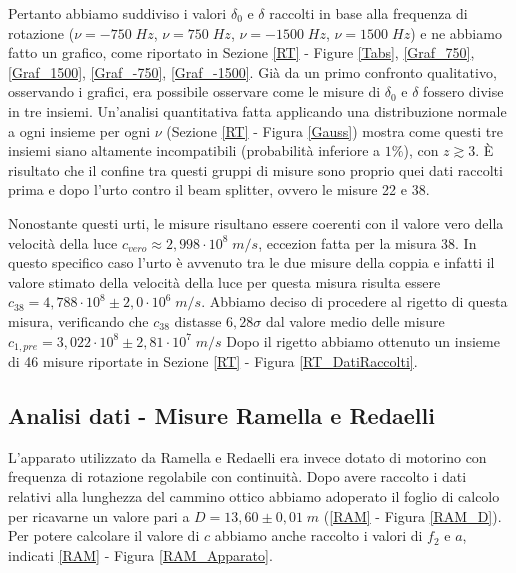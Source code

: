 \documentclass{article}
\begin{document}
\vspace{3mm}

Pertanto abbiamo suddiviso i valori $\delta_0$ e $\delta$ raccolti in base alla frequenza di rotazione ($\nu=-750 \; Hz$, $\nu=750 \; Hz$, 
$\nu=-1500 \; Hz$, $\nu=1500 \; Hz$) e ne abbiamo fatto un grafico, come riportato in Sezione \ref{RT} - Figure \ref{Tabs}, \ref{Graf_750}, \ref{Graf_1500}, \ref{Graf_-750}, 
\ref{Graf_-1500}. 
Già da un primo confronto qualitativo, osservando i grafici, era possibile osservare come le misure di $\delta_0$ e $\delta$ fossero divise in tre insiemi. Un'analisi 
quantitativa fatta applicando una distribuzione normale a ogni insieme per ogni $\nu$ (Sezione \ref{RT} - Figura \ref{Gauss}) mostra come questi tre insiemi siano altamente incompatibili
(probabilità inferiore a $1\%$), con $z\gtrsim 3$. 
È risultato che il confine tra questi gruppi di misure sono proprio quei dati raccolti prima e dopo l'urto contro il beam splitter, ovvero le misure 22 e 38.

\vspace{3mm}

Nonostante questi urti, le misure risultano essere coerenti con il valore vero della velocità della luce $c_{vero}\approx 2,998\cdot10^8 \; m/s$, eccezion fatta per la misura 38.
In questo specifico caso l'urto è avvenuto tra le due misure della coppia e infatti il valore stimato della velocità della luce per questa misura risulta essere $c_{38}=4,788\cdot10^8 \pm 2,0\cdot10^6 \; m/s$. Abbiamo deciso di procedere al rigetto di questa misura, verificando che $c_{38}$ distasse $6,28\sigma$ dal valore medio delle misure $c_{1,pre} = 3,022 \cdot 10^8 \pm 2,81 \cdot 10^7 \; m/s$
Dopo il rigetto abbiamo ottenuto un insieme di 46 misure riportate in Sezione \ref{RT} - Figura \ref{RT_DatiRaccolti}.

\vspace{3mm}


\subsection{Analisi dati - Misure Ramella e Redaelli}

L'apparato utilizzato da Ramella e Redaelli era invece dotato di motorino con frequenza di rotazione regolabile con continuità. Dopo avere raccolto i dati relativi alla 
lunghezza del cammino ottico abbiamo adoperato il foglio di calcolo per ricavarne un valore pari a $D = 13,60 \pm 0,01 \; m$ (\ref{RAM} - Figura \ref{RAM_D}). Per potere 
calcolare il valore di $c$ abbiamo anche raccolto i valori di $f_2$ e $a$, indicati \ref{RAM} - Figura \ref{RAM_Apparato}.
\end{document}
